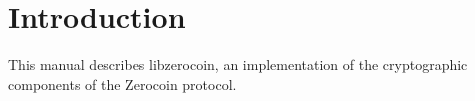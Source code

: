 \section{Introduction}

This manual describes \textsf{libzerocoin}, an implementation of the cryptographic components of the Zerocoin protocol.
